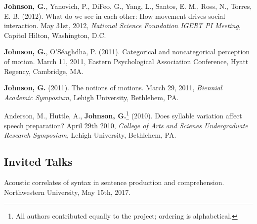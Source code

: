 \textbf{Johnson, G.}, Yanovich, P., DiFeo, G., Yang, L., Santos, E. M., Ross, N., Torres, E. B. (2012). What do we see in each other: How movement drives social interaction. May 31st, 2012, \textit{National Science Foundation IGERT PI Meeting}, Capitol Hilton, Washington, D.C.



\textbf{Johnson, G.}, O'S\'eaghdha, P. (2011). Categorical and noncategorical perception of motion. March 11, 2011, Eastern Psychological Association Conference, Hyatt Regency, Cambridge, MA.



\textbf{Johnson, G.} (2011). The notions of motions. March 29, 2011, \textit{Biennial Academic Symposium}, Lehigh University, Bethlehem, PA.



Anderson, M., Huttle, A., \textbf{Johnson, G.}\footnote{All authors contributed equally to the project; ordering is alphabetical.} (2010). Does syllable variation affect speech preparation? April 29th 2010, \textit{College of Arts and Scienes Undergraduate Research Symposium}, Lehigh University, Bethlehem, PA.

\subsection*{Invited Talks}

Acoustic correlates of syntax in sentence production and comprehension. Northwestern University, May 15th, 2017.
